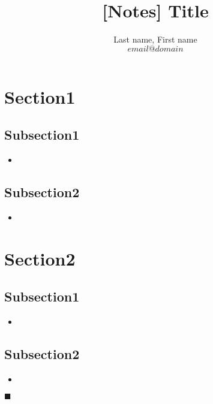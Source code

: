 \documentclass[11pt]{article}
\title{[Notes] Title}
\author{Last name, First name  \\ $email@domain$}
\begin{document}
\maketitle

\section{Section1}

\subsection{Subsection1}
\begin{itemize}
\item 
\end{itemize}

\subsection{Subsection2}
\begin{itemize}
\item
\end{itemize}

\section{Section2}

\subsection{Subsection1}
\begin{itemize}
\item 
\end{itemize}

\subsection{Subsection2}
\begin{itemize}
\item
\end{itemize}


$\blacksquare$
\end{document}
